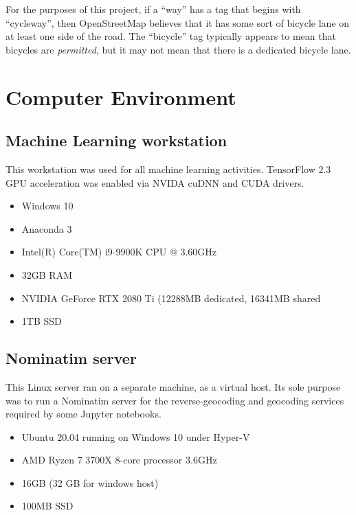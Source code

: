 \documentclass[11pt,twoside]{report}
\begin{document}
For the purposes of this project, if a ``way'' has a tag that begins with ``cycleway'', then OpenStreetMap believes that it has some sort of bicycle lane on at least one side of the road.  The ``bicycle'' tag typically appears to mean that bicycles are \textit{permitted}, but it may not mean that there is a dedicated bicycle lane.


\chapter{Computer Environment}
\label{a:environment}

\section{Machine Learning workstation}
\label{a:computer}

This workstation was used for all machine learning activities.  TensorFlow 2.3 GPU acceleration was enabled via NVIDA cuDNN and CUDA drivers.

\begin{itemize}
\item{Windows 10}
\item{Anaconda 3}
\item{Intel(R) Core(TM) i9-9900K CPU @ 3.60GHz}	
\item{32GB RAM}
\item{NVIDIA GeForce RTX 2080 Ti (12288MB dedicated, 16341MB shared}
\item{1TB SSD}
\end{itemize}


\section{Nominatim server}
\label{a:nominatim}

This Linux server ran on a separate machine, as a virtual host.  Its sole purpose was to run a Nominatim server for the reverse-geocoding and geocoding services required by some Jupyter notebooks.

\begin{itemize}
\item{Ubuntu 20.04 running on Windows 10 under Hyper-V}
\item{AMD Ryzen 7 3700X 8-core processor 3.6GHz}
\item{16GB (32 GB for windows host)}
\item{100MB SSD}
\end{itemize}
\end{document}

